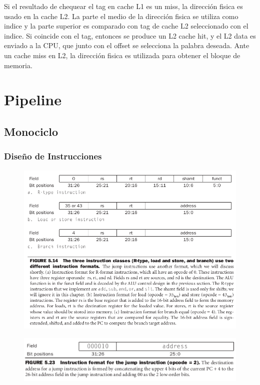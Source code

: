 \documentclass{article}
\begin{document}
Si el resultado de chequear el tag en cache L1 es un miss, la dirección fisica es usado en la cache L2. La parte el medio de la dirección fisica se utiliza como indice y la parte superior es comparado con tag de cache L2 seleccionado con el indice. Si coincide con el tag, entonces se produce un L2 cache hit, y el L2 data es enviado a la CPU, que junto con el offset se selecciona la palabra deseada.
Ante un cache miss en L2, la dirección fisica es utilizada para obtener el bloque de memoria.

\newpage
\section{Pipeline}


\subsection{Monociclo}

\subsubsection{Diseño de Instrucciones}

\begin{figure}[h!]
    \includegraphics[width=\linewidth]{imagenes/pipeline/formato-inst.png}
\end{figure}
\begin{figure}[h!]
    \includegraphics[width=\linewidth]{imagenes/pipeline/format-jump.png}
\end{figure}
\end{document}
